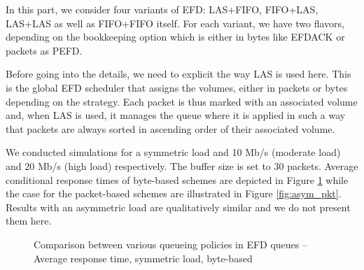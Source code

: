 \documentclass[preprint,12pt]{elsarticle}
\begin{document}
In this part, we consider four variants of EFD: LAS+FIFO, FIFO+LAS, LAS+LAS as well as FIFO+FIFO itself. For each variant, we have two flavors, depending on the bookkeeping option which is either in bytes like EFDACK or packets as PEFD.%

Before going into the details, we need to explicit the way LAS is used here. This is the global EFD scheduler that assigns the volumes, either in packets or bytes depending on the strategy. Each packet is thus marked with an associated volume and, when LAS is used, it manages the queue where it is applied in such a way that packets are always sorted in ascending order of their associated volume.

We conducted simulations for a symmetric load and 10 Mb/s (moderate load) and 20 Mb/s (high load) respectively. The buffer size is set to 30 packets. Average conditional response times of byte-based schemes are depicted in Figure \ref{fig:asym_byte} while the case for the packet-based schemes are illustrated in Figure \ref{fig:asym_pkt}. Results with an asymmetric load are qualitatively similar and we do not present them here.

\begin{figure}[ht!]
  \centering
  \caption{Comparison between various queueing policies in EFD  queues -- Average response time, symmetric load, byte-based}
  \label{fig:asym_byte}
\end{figure}
\end{document}
